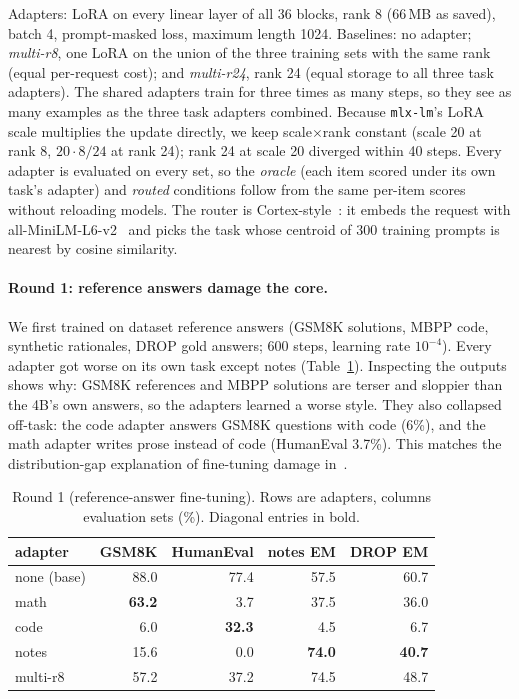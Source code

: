 \documentclass[11pt]{article}
\begin{document}
Adapters: LoRA on every linear layer of all 36 blocks, rank 8 (66\,MB as saved), batch 4, prompt-masked
loss, maximum length 1024. Baselines: no adapter; \emph{multi-r8}, one LoRA on the union of the three
training sets with the same rank (equal per-request cost); and \emph{multi-r24}, rank 24 (equal storage to
all three task adapters). The shared adapters train for three times as many steps, so they see as many
examples as the three task adapters combined. Because \texttt{mlx-lm}'s LoRA scale multiplies the update
directly, we keep scale$\times$rank constant (scale 20 at rank 8, $20\cdot 8/24$ at rank 24); rank 24 at
scale 20 diverged within 40 steps. Every adapter is evaluated on every set, so the \emph{oracle}
(each item scored under its own task's adapter) and \emph{routed} conditions follow from the same
per-item scores without reloading models. The router is Cortex-style~\cite{ulhaq2026cortex}: it embeds the
request with all-MiniLM-L6-v2~\cite{wang2020minilm} and picks the task whose centroid of 300 training
prompts is nearest by cosine similarity.

\paragraph{Round 1: reference answers damage the core.} We first trained on dataset reference answers
(GSM8K solutions, MBPP code, synthetic rationales, DROP gold answers; 600 steps, learning rate
$10^{-4}$). Every adapter got worse on its own task except notes (Table~\ref{tab:exp3r1}). Inspecting the
outputs shows why: GSM8K references and MBPP solutions are terser and sloppier than the 4B's own answers,
so the adapters learned a worse style. They also collapsed off-task: the code adapter answers GSM8K
questions with code (6\%), and the math adapter writes prose instead of code (HumanEval 3.7\%). This
matches the distribution-gap explanation of fine-tuning damage in~\cite{yang2024sdft}.

\begin{table}[h]
\centering\small
\caption{Round 1 (reference-answer fine-tuning). Rows are adapters, columns evaluation sets (\%).
Diagonal entries in bold.}
\label{tab:exp3r1}
\begin{tabular}{lrrrr}
\toprule
adapter & GSM8K & HumanEval & notes EM & DROP EM \\
\midrule
none (base) & 88.0 & 77.4 & 57.5 & 60.7 \\
math & \textbf{63.2} & 3.7 & 37.5 & 36.0 \\
code & 6.0 & \textbf{32.3} & 4.5 & 6.7 \\
notes & 15.6 & 0.0 & \textbf{74.0} & \textbf{40.7} \\
multi-r8 & 57.2 & 37.2 & 74.5 & 48.7 \\
\bottomrule
\end{tabular}
\end{table}
\end{document}
